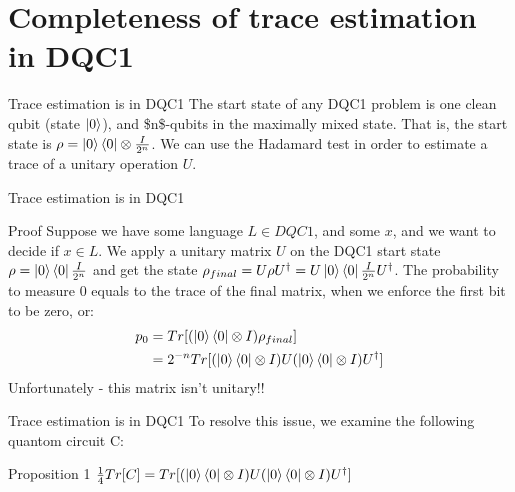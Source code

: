 \documentclass[leqno,fleqn]{beamer}
\begin{document}
\section{Completeness of trace estimation in DQC1}
\label{sec:orgheadline20}
\begin{frame}[label={sec:orgheadline13}]{Trace estimation is in DQC1}
The start state of any DQC1 problem is one clean qubit (state \(\left\vert{0}\right\rangle\)), and \$n\$-qubits in the maximally mixed state. That is, the start state is \(\rho = \left\vert{0}\right\rangle\left\langle{0}\right\vert \otimes \frac{I}{2^n}\). We can use the Hadamard test in order to estimate a trace of a unitary operation \(U\).
\end{frame}
\begin{frame}[label={sec:orgheadline14}]{Trace estimation is in DQC1}
\begin{block}{Proof}
Suppose we have some language \(L \in DQC1\), and some \(x\), and we want to decide if \(x \in L\). We apply a unitary matrix \(U\) on the DQC1 start state \(\rho=\left\vert{0}\right\rangle\left\langle{0}\right\vert\frac{I}{2^n}\) and get the state \(\rho_{final} = U \rho U^\dagger = U\left\vert{0}\right\rangle\left\langle{0}\right\vert\frac{I}{2^n}U^\dagger\).
The probability to measure 0 equals to the trace of the final matrix, when we enforce the first bit to be zero, or:
\begin{align*}
 p_{0} &= Tr[(\left\vert{0}\right\rangle\left\langle{0}\right\vert\otimes I)\rho_{final}] \\
     &= 2^{-n}Tr[(\left\vert{0}\right\rangle\left\langle{0}\right\vert \otimes I)U(\left\vert{0}\right\rangle \left\langle{0}\right\vert \otimes I)U^\dagger]
\end{align*}
Unfortunately - this matrix isn't unitary!!
\end{block}
\end{frame}
\begin{frame}[label={sec:orgheadline15}]{Trace estimation is in DQC1}
To resolve this issue, we examine the following quantom circuit C:

\begin{block}{Proposition 1}
\(\frac{1}{4}Tr[C]=Tr[(\left\vert{0}\right\rangle\left\langle{0}\right\vert\otimes I)U(\left\vert{0}\right\rangle\left\langle{0}\right\vert\otimes I)U^\dagger]\)
\end{block}
\end{frame}
\end{document}
